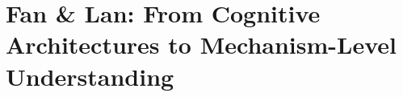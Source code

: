 \part{Fan \& Lan: From Cognitive Architectures to Mechanism-Level Understanding}
\label{part:fan-lan}










